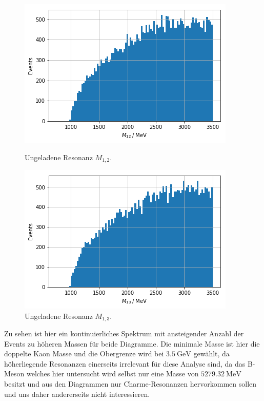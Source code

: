 \begin{figure}[htb]
  \centering
    \includegraphics[width=\linewidth]{plots/sim_twobody_resonance_m12.png}
    \caption{Ungeladene Resonanz $M_{1,2}$.\label{fig:m12}}
  \endminipage\hfill
    \includegraphics[width=\linewidth]{plots/sim_twobody_resonance_m13.png}
    \caption{Ungeladene Resonanz $M_{1,3}$.\label{fig:m13}}
  \endminipage
  \label{fig:resonances}
\end{figure}
Zu sehen ist hier ein kontinuierliches Spektrum mit ansteigender Anzahl der Events zu h\"oheren Massen f\"ur beide Diagramme.
Die minimale Masse ist hier die doppelte Kaon Masse und die Obergrenze wird bei $\SI{3.5}{\giga\electronvolt}$ gew\"ahlt, da h\"oherliegende Resonanzen einerseits irrelevant f\"ur diese Analyse sind, da das B-Meson welches hier untersucht wird selbst nur eine Masse von $\SI{5279.32}{\mega\electronvolt}$ besitzt und aus den Diagrammen nur Charme-Resonanzen hervorkommen sollen und uns daher andererseits nicht interessieren.

